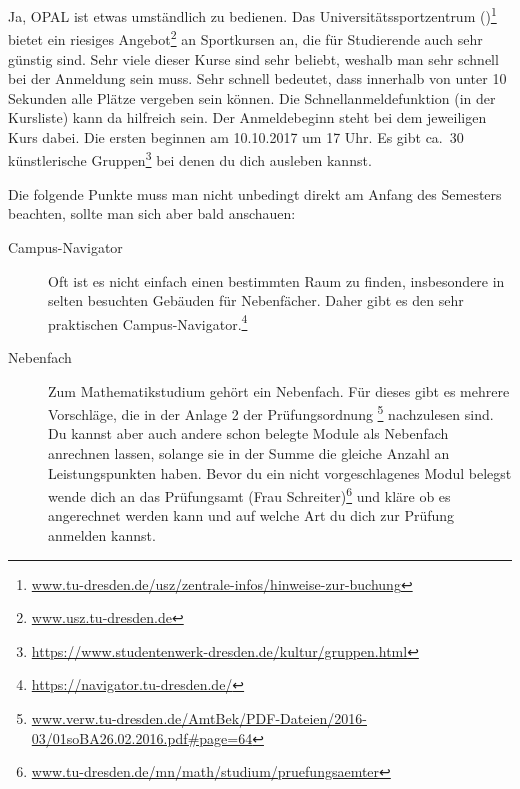 \documentclass{scrartcl}
\begin{document}
\begin{description}
\begin{description}
    Ja, OPAL ist etwas umständlich zu bedienen.
   Das Universitätssportzentrum ()\footnote{\url{www.tu-dresden.de/usz/zentrale-infos/hinweise-zur-buchung}} bietet ein riesiges Angebot\footnote{\url{www.usz.tu-dresden.de}} an
    Sportkursen an, die für Studierende auch sehr günstig sind.
    Sehr viele dieser Kurse sind sehr beliebt, weshalb man sehr schnell bei der Anmeldung sein muss.
    Sehr schnell bedeutet, dass innerhalb von unter 10 Sekunden alle Plätze vergeben sein können.
    Die Schnellanmeldefunktion (in der Kursliste) kann da hilfreich sein.
    Der Anmeldebeginn steht bei dem jeweiligen Kurs dabei. Die ersten beginnen am 10.10.2017 um 17 Uhr.
   Es gibt ca.\ 30 künstlerische Gruppen\footnote{\url{https://www.studentenwerk-dresden.de/kultur/gruppen.html}} bei denen du dich ausleben kannst.
\end{description}
Die folgende Punkte muss man nicht unbedingt direkt am Anfang des Semesters beachten, sollte man
sich aber bald anschauen:
\begin{description}
  \item[Campus-Navigator] Oft ist es nicht einfach einen bestimmten Raum zu finden,
    insbesondere in selten besuchten Gebäuden für Nebenfächer.
    Daher gibt es den sehr praktischen Campus-Navigator.\footnote{\url{https://navigator.tu-dresden.de/}}
  \item[Nebenfach] Zum Mathematikstudium gehört ein Nebenfach.
    Für dieses gibt es mehrere Vorschläge, die in der Anlage 2 der Prüfungsordnung
    \footnote{\url{www.verw.tu-dresden.de/AmtBek/PDF-Dateien/2016-03/01soBA26.02.2016.pdf\#page=64}}
    nachzulesen sind.
    Du kannst aber auch andere schon belegte Module als Nebenfach anrechnen lassen, solange sie in der Summe
    die gleiche Anzahl an Leistungspunkten haben.
    Bevor du ein nicht vorgeschlagenes Modul belegst wende dich an das Prüfungsamt (Frau Schreiter)\footnote{\url{www.tu-dresden.de/mn/math/studium/pruefungsaemter}\label{pruefungsamt}}
    und kläre ob es angerechnet werden kann und auf welche Art
    du dich zur Prüfung anmelden kannst.


\end{description}
\end{description}
\end{document}

